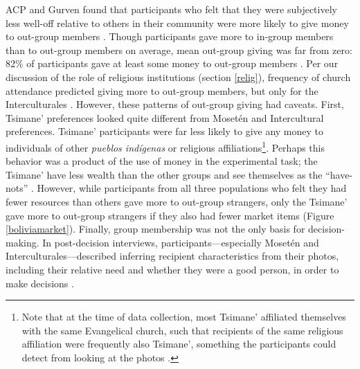 \documentclass[bibauthoryear]{aa}
\begin{document}
ACP and Gurven found that participants who felt that they were subjectively less well-off relative to others in their community were more likely to give money to out-group members \citep{pisor2016risk}. Though participants gave more to in-group members than to out-group members on average, mean out-group giving was far from zero: 82\% of participants gave at least some money to out-group members \citep{pisor2018diversify}. %
Per our discussion of the role of religious institutions (section \ref{relig}), frequency of church attendance predicted giving more to out-group members, but only for the Interculturales \citep{pisor2016risk}. However, these patterns of out-group giving had caveats. First, Tsimane' preferences looked quite different from Moset\'en and Intercultural preferences. Tsimane' participants were far less likely to give any money to individuals of other \textit{pueblos ind\'igenas} or  religious affiliations\footnote{Note that at the time of data collection, most Tsimane' affiliated themselves with the same Evangelical church, such that recipients of the same religious affiliation were frequently also Tsimane', something the participants could detect from looking at the photos \citep{pisor2018diversify}.}. Perhaps this behavior was a product of the use of money in the experimental task; the Tsimane' have less wealth than the other groups and see themselves as the ``have-nots''  \citep{pisor2018diversify}. However, while participants from all three populations who felt they had fewer resources than others gave more to out-group strangers, only the Tsimane' gave more to out-group strangers if they also had fewer market items  (Figure \ref{boliviamarket}). Finally, group membership was not the only basis for decision-making. In post-decision interviews, participants---especially Moset\'en and Interculturales---described inferring recipient characteristics from their photos, including their relative need and whether they were a good person, in order to make decisions \citep{pisor2018diversify, Pisor2020}.
\end{document}
